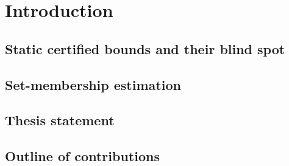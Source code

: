 
\section{Introduction}
\label{p2:sec:intro}

\subsection{Static certified bounds and their blind spot}
\label{p2:sub:static_bounds}

\subsection{Set-membership estimation}
\label{p2:sub:set_membership_estimation}

\subsection{Thesis statement}
\label{p2:sub:thesis_statement}

\subsection{Outline of contributions}
\label{p2:sub:outline_of_contributions}
